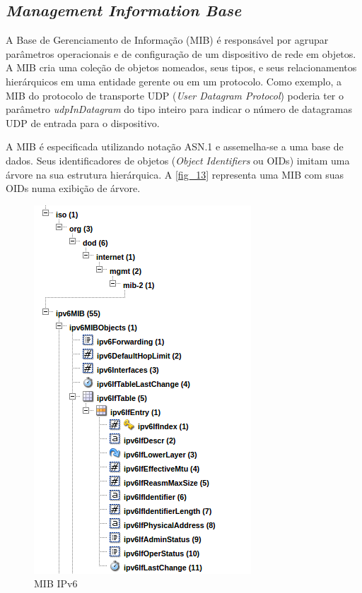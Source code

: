 \documentclass[
12pt,				%
openright,			%
oneside,			%
a4paper,			%
brazil,				%
]{abntex2}
\begin{document}
{\begin{anexosenv}
	\chapter{\label{MIB}\textit{Management Information Base}}
	
	\par A Base de Gerenciamento de Informação (MIB) é responsável por agrupar parâmetros operacionais e de configuração de um dispositivo de rede em objetos. A MIB cria uma coleção de objetos nomeados, seus tipos, e seus relacionamentos hierárquicos em uma entidade gerente ou em um protocolo. Como exemplo, a MIB do protocolo de transporte UDP (\textit{User Datagram Protocol}) poderia ter o parâmetro \textit{udpInDatagram} do tipo inteiro para indicar o número de datagramas UDP de entrada para o dispositivo. 
	
	\par A MIB é especificada utilizando notação ASN.1 e assemelha-se a uma base de dados. Seus identificadores de objetos (\textit{Object Identifiers} ou OIDs) imitam uma árvore na sua estrutura hierárquica. A \autoref{fig_13} representa uma MIB com suas OIDs numa exibição de árvore.
	
	\begin{figure} [H]
		\centering
		\includegraphics[scale=.7]{figuras/cap2/13MIBIPv6}
		\caption{\label{fig_13}MIB IPv6}
	\end{figure}
	

\end{anexosenv}}
\end{document}
